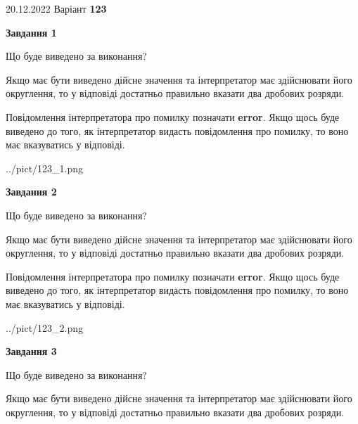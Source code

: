\documentclass[12pt, ukrainian]{article}
\begin{document}
{20.12.2022 Варіант \No \textbf { 123 }\par}
{
\begin {Large}

{\begin {center}\textbf{Завдання 1}\end {center}}\par
Що буде виведено за виконання? \par

Якщо має бути виведено дійсне значення та інтерпретатор має здійснювати його округлення, 
то у відповіді достатньо правильно вказати два дробових розряди.

Повідомлення інтерпретатора про помилку позначати \textbf{error}.
Якщо щось буде виведено до того, як інтерпретатор видасть повідомлення про помилку, 
то воно має вказуватись у відповіді. \par

\begin{center}
	{../pict/123_1.png}
\end{center}
\newpage

{\begin {center}\textbf{Завдання 2}\end {center}}\par
Що буде виведено за виконання? \par

Якщо має бути виведено дійсне значення та інтерпретатор має здійснювати його округлення, 
то у відповіді достатньо правильно вказати два дробових розряди.

Повідомлення інтерпретатора про помилку позначати \textbf{error}.
Якщо щось буде виведено до того, як інтерпретатор видасть повідомлення про помилку, 
то воно має вказуватись у відповіді. \par

\begin{center}
	{../pict/123_2.png}
\end{center}
\newpage

{\begin {center}\textbf{Завдання 3}\end {center}}\par
Що буде виведено за виконання? \par

Якщо має бути виведено дійсне значення та інтерпретатор має здійснювати його округлення, 
то у відповіді достатньо правильно вказати два дробових розряди.


\end{Large}}
\end{document}
